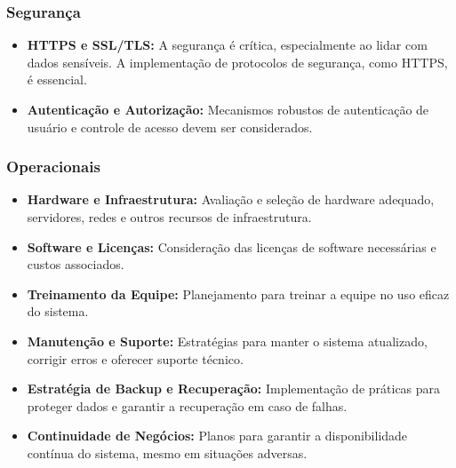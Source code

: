        \subsubsection{Segurança}
       
       \begin{itemize}
       	\item \textbf{HTTPS e SSL/TLS:} A segurança é crítica, especialmente ao lidar com dados sensíveis. A implementação de protocolos de segurança, como HTTPS, é essencial.
       	\item \textbf{Autenticação e Autorização:} Mecanismos robustos de autenticação de usuário e controle de acesso devem ser considerados.
       \end{itemize}
       
       \subsubsection{Operacionais}
       
       \begin{itemize}
       	\item \textbf{Hardware e Infraestrutura:} Avaliação e seleção de hardware adequado, servidores, redes e outros recursos de infraestrutura.
       	\item \textbf{Software e Licenças:} Consideração das licenças de software necessárias e custos associados.
       	\item \textbf{Treinamento da Equipe:} Planejamento para treinar a equipe no uso eficaz do sistema.
       	\item \textbf{Manutenção e Suporte:} Estratégias para manter o sistema atualizado, corrigir erros e oferecer suporte técnico.
       	\item \textbf{Estratégia de Backup e Recuperação:} Implementação de práticas para proteger dados e garantir a recuperação em caso de falhas.
       	\item \textbf{Continuidade de Negócios:} Planos para garantir a disponibilidade contínua do sistema, mesmo em situações adversas.
       \end{itemize} 
    
